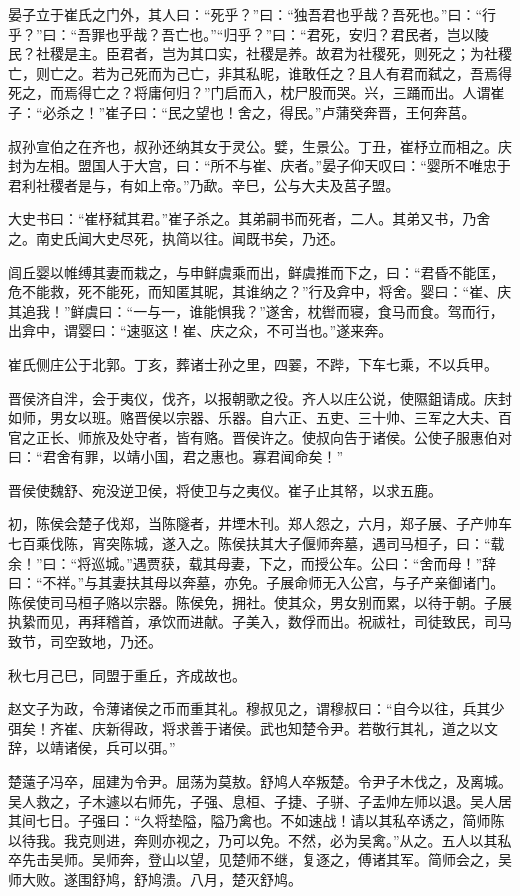 \documentclass[]{article}
\begin{document}
晏子立于崔氏之门外，其人曰：``死乎？''曰：``独吾君也乎哉？吾死也。''曰：``行乎？''曰：``吾罪也乎哉？吾亡也。''``归乎？''曰：``君死，安归？君民者，岂以陵民？社稷是主。臣君者，岂为其口实，社稷是养。故君为社稷死，则死之；为社稷亡，则亡之。若为己死而为己亡，非其私昵，谁敢任之？且人有君而弑之，吾焉得死之，而焉得亡之？将庸何归？''门启而入，枕尸股而哭。兴，三踊而出。人谓崔子：``必杀之！''崔子曰：``民之望也！舍之，得民。''卢蒲癸奔晋，王何奔莒。

叔孙宣伯之在齐也，叔孙还纳其女于灵公。嬖，生景公。丁丑，崔杼立而相之。庆封为左相。盟国人于大宫，曰：``所不与崔、庆者。''晏子仰天叹曰：``婴所不唯忠于君利社稷者是与，有如上帝。''乃歃。辛巳，公与大夫及莒子盟。

大史书曰：``崔杼弑其君。''崔子杀之。其弟嗣书而死者，二人。其弟又书，乃舍之。南史氏闻大史尽死，执简以往。闻既书矣，乃还。

闾丘婴以帷缚其妻而栽之，与申鲜虞乘而出，鲜虞推而下之，曰：``君昏不能匡，危不能救，死不能死，而知匿其昵，其谁纳之？''行及弇中，将舍。婴曰：``崔、庆其追我！''鲜虞曰：``一与一，谁能惧我？''遂舍，枕辔而寝，食马而食。驾而行，出弇中，谓婴曰：``速驱这！崔、庆之众，不可当也。''遂来奔。

崔氏侧庄公于北郭。丁亥，葬诸士孙之里，四翣，不跸，下车七乘，不以兵甲。

晋侯济自泮，会于夷仪，伐齐，以报朝歌之役。齐人以庄公说，使隰鉏请成。庆封如师，男女以班。赂晋侯以宗器、乐器。自六正、五吏、三十帅、三军之大夫、百官之正长、师旅及处守者，皆有赂。晋侯许之。使叔向告于诸侯。公使子服惠伯对曰：``君舍有罪，以靖小国，君之惠也。寡君闻命矣！''

晋侯使魏舒、宛没逆卫侯，将使卫与之夷仪。崔子止其帑，以求五鹿。

初，陈侯会楚子伐郑，当陈隧者，井堙木刊。郑人怨之，六月，郑子展、子产帅车七百乘伐陈，宵突陈城，遂入之。陈侯扶其大子偃师奔墓，遇司马桓子，曰：``载余！''曰：``将巡城。''遇贾获，载其母妻，下之，而授公车。公曰：``舍而母！''辞曰：``不祥。''与其妻扶其母以奔墓，亦免。子展命师无入公宫，与子产亲御诸门。陈侯使司马桓子赂以宗器。陈侯免，拥社。使其众，男女别而累，以待于朝。子展执絷而见，再拜稽首，承饮而进献。子美入，数俘而出。祝祓社，司徒致民，司马致节，司空致地，乃还。

秋七月己巳，同盟于重丘，齐成故也。

赵文子为政，令薄诸侯之币而重其礼。穆叔见之，谓穆叔曰：``自今以往，兵其少弭矣！齐崔、庆新得政，将求善于诸侯。武也知楚令尹。若敬行其礼，道之以文辞，以靖诸侯，兵可以弭。''

楚薳子冯卒，屈建为令尹。屈荡为莫敖。舒鸠人卒叛楚。令尹子木伐之，及离城。吴人救之，子木遽以右师先，子强、息桓、子捷、子骈、子盂帅左师以退。吴人居其间七日。子强曰：``久将垫隘，隘乃禽也。不如速战！请以其私卒诱之，简师陈以待我。我克则进，奔则亦视之，乃可以免。不然，必为吴禽。''从之。五人以其私卒先击吴师。吴师奔，登山以望，见楚师不继，复逐之，傅诸其军。简师会之，吴师大败。遂围舒鸠，舒鸠溃。八月，楚灭舒鸠。
\end{document}
